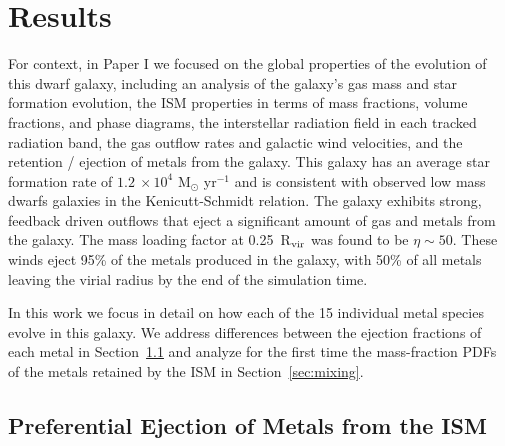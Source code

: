 \documentclass[twocolumn]{aastex61}
\begin{document}
\section{Results}
For context, in Paper I we focused on the global properties of the evolution of this dwarf galaxy, including an analysis of the galaxy's gas mass and star formation evolution, the ISM properties in terms of mass fractions, volume fractions, and phase diagrams, the interstellar radiation field in each tracked radiation band, the gas outflow rates and galactic wind velocities, and the retention / ejection of metals from the galaxy. This galaxy has an average star formation rate of $1.2~\times 10^{4}$ M$_{\odot}$ yr$^{-1}$ and is consistent with observed low mass dwarfs galaxies in the Kenicutt-Schmidt relation.  The galaxy exhibits strong, feedback driven outflows that eject a significant amount of gas and metals from the galaxy. The mass loading factor at 0.25~R$_{\rm vir}$ was found to be $\eta \sim 50$. These winds eject 95\% of the metals produced in the galaxy, with 50\% of all metals leaving the virial radius by the end of the simulation time.

In this work we focus in detail on how each of the 15 individual metal species evolve in this galaxy. We address differences between the ejection fractions of each metal in Section~\ref{sec:ejection} and analyze for the first time the mass-fraction PDFs of the metals retained by the ISM in Section~\ref{sec:mixing}.

\subsection{Preferential Ejection of Metals from the ISM}
\label{sec:ejection}
\end{document}
